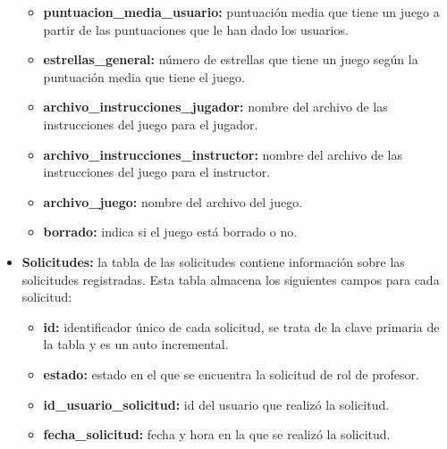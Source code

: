 \begin{itemize}
\begin{itemize}
            \item \textbf{puntuacion\_media\_usuario:} puntuación media que tiene un juego a partir de las puntuaciones que le han dado los usuarios.
            \item \textbf{estrellas\_general:} número de estrellas que tiene un juego según la puntuación media que tiene el juego.
            \item \textbf{archivo\_instrucciones\_jugador:} nombre del archivo de las instrucciones del juego para el jugador.
            \item \textbf{archivo\_instrucciones\_instructor:} nombre del archivo de las instrucciones del juego para el instructor.
            \item \textbf{archivo\_juego:} nombre del archivo del juego.                                          \item \textbf{borrado:} indica si el juego está borrado o no.
        \end{itemize}

    \item \textbf{Solicitudes:} la tabla de las solicitudes contiene información sobre las solicitudes registradas. Esta tabla almacena los siguientes campos para cada solicitud:
        \begin{itemize}
        \tightlist
            \item \textbf{id:} identificador único de cada solicitud, se trata de la clave primaria de la tabla y es un auto incremental.
            \item \textbf{estado:} estado en el que se encuentra la solicitud de rol de profesor.
            \item \textbf{id\_usuario\_solicitud:} id del usuario que realizó la solicitud.
            \item \textbf{fecha\_solicitud:} fecha y hora en la que se realizó la solicitud.
        \end{itemize}


\end{itemize}
